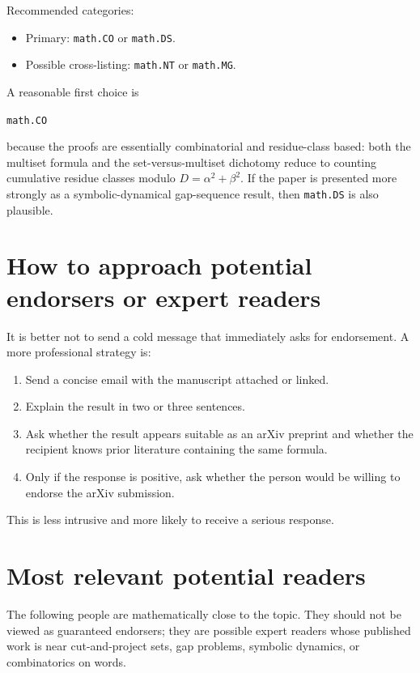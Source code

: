 \documentclass[11pt]{article}
\begin{document}
Recommended categories:

\begin{itemize}
    \item Primary: \texttt{math.CO} or \texttt{math.DS}.
    \item Possible cross-listing: \texttt{math.NT} or \texttt{math.MG}.
\end{itemize}

A reasonable first choice is

\begin{center}
\texttt{math.CO}
\end{center}

because the proofs are essentially combinatorial and residue-class based:
both the multiset formula and the set-versus-multiset dichotomy reduce
to counting cumulative residue classes modulo \(D = \alpha^2 + \beta^2\).
If the paper is presented more strongly as a symbolic-dynamical
gap-sequence result, then \texttt{math.DS} is also plausible.

\section*{How to approach potential endorsers or expert readers}

It is better not to send a cold message that immediately asks for endorsement.
A more professional strategy is:

\begin{enumerate}
    \item Send a concise email with the manuscript attached or linked.
    \item Explain the result in two or three sentences.
    \item Ask whether the result appears suitable as an arXiv preprint and
    whether the recipient knows prior literature containing the same formula.
    \item Only if the response is positive, ask whether the person would be
    willing to endorse the arXiv submission.
\end{enumerate}

This is less intrusive and more likely to receive a serious response.

\section*{Most relevant potential readers}

The following people are mathematically close to the topic.  They should not
be viewed as guaranteed endorsers; they are possible expert readers whose
published work is near cut-and-project sets, gap problems, symbolic dynamics,
or combinatorics on words.
\end{document}

